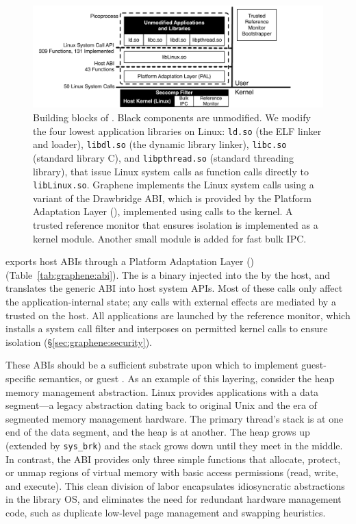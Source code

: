\begin{figure}[t]
\centering
\includegraphics[width=6.5in]{graphene/figures/arch.pdf}
\caption[The \sysname{} building blocks]
{Building blocks of \sysname{}.  Black components are unmodified.
We modify the four lowest application libraries on Linux:
{\tt ld.so} (the ELF linker and loader),
{\tt libdl.so} (the dynamic library linker),
{\tt libc.so} (standard library C),
and {\tt libpthread.so} (standard threading library),
that issue Linux system calls as function calls directly to {\tt libLinux.so}.
Graphene implements the Linux system calls
using a variant of the Drawbridge ABI,
which is provided by the Platform Adaptation Layer (\pal{}),
implemented using calls to the kernel.
A trusted reference monitor that ensures \libos{} isolation
is implemented as a kernel module.
Another small module is added for fast bulk IPC.}
\label{fig:graphene:arch}
\end{figure}


\sysname{} exports \palcalls{} host ABIs through a 
Platform Adaptation Layer (\pal{}) (Table~\ref{tab:graphene:abi}).
The \pal{} is a binary injected into the \picoproc{} by the host, 
and translates the generic \picoproc{} ABI into host system APIs.
Most of these calls only affect the application-internal state;
any calls with external effects are mediated by a trusted  on the host.
All \sysname{} applications are launched by the reference monitor,
which installs a system call filter and interposes on permitted kernel calls to ensure isolation
(\S\ref{sec:graphene:security}).


These \pal{} ABIs should be a sufficient substrate upon which to
implement guest-specific semantics, or guest .
As an example of this layering, consider the heap memory management abstraction.
Linux provides applications with a data segment---a 
legacy abstraction dating back to original Unix and the era 
of segmented memory management hardware.
The primary thread's stack is at one end of the data segment, and the heap is at another.  
The heap grows up (extended by {\tt sys\_brk}) 
and the stack grows down until they meet in the middle.
In contrast, the \pal{} ABI provides only three simple functions 
that allocate, protect, or unmap regions of virtual memory
with basic access permissions (read, write, and execute).
This clean division of labor encapsulates 
idiosyncratic abstractions in the library OS,
and eliminates the need for
redundant hardware management code, 
such as duplicate low-level page management and swapping heuristics.


